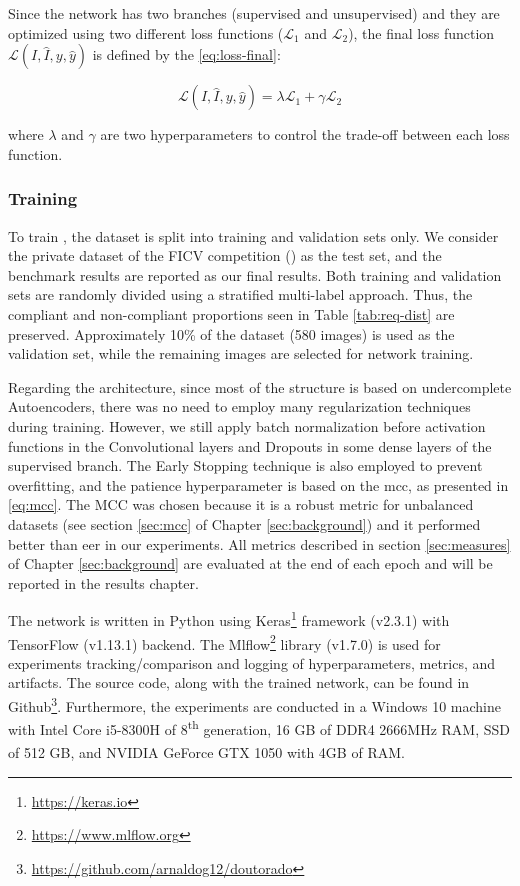 Since the network has two branches (supervised and unsupervised) and they are optimized using two different loss functions ($\mathcal{L}_1$ and $\mathcal{L}_2$), the final loss function $\mathcal{L}(I, \hat{I}, y, \hat{y})$ is defined by the \autoref{eq:loss-final}:

\begin{equation}
\label{eq:loss-final}
\mathcal{L}(I, \hat{I}, y, \hat{y}) = \lambda\mathcal{L}_1 + \gamma\mathcal{L}_2
\end{equation}

\noindent where $\lambda$ and $\gamma$ are two hyperparameters to control the trade-off between each loss function.

\subsubsection{Training} 

To train \methodname, the \ficvtest dataset is split into training and validation sets only. We consider the private dataset of the FICV competition (\ficvofficial) as the test set, and the benchmark results are reported as our final results. Both training and validation sets are randomly divided using a stratified multi-label approach. Thus, the compliant and non-compliant proportions seen in Table \ref{tab:req-dist} are preserved. Approximately 10\% of the dataset (580 images) is used as the validation set, while the remaining images are selected for network training.

Regarding the architecture, since most of the \methodname structure is based on undercomplete Autoencoders, there was no need to employ many regularization techniques during training. However, we still apply batch normalization before activation functions in the Convolutional layers and Dropouts in some dense layers of the supervised branch. The Early Stopping technique is also employed to prevent overfitting, and the patience hyperparameter is based on the \acl{mcc}, as presented in \autoref{eq:mcc}. The MCC was chosen because it is a robust metric for unbalanced datasets (see section \ref{sec:mcc} of Chapter \ref{sec:background}) and it performed better than \acs{eer} in our experiments. All metrics described in section \ref{sec:measures} of Chapter \ref{sec:background} are evaluated at the end of each epoch and will be reported in the results chapter.

The network is written in Python using Keras\footnote{\url{https://keras.io}} framework (v2.3.1) with TensorFlow (v1.13.1) backend. The Mlflow\footnote{\url{https://www.mlflow.org}} library (v1.7.0) is used for experiments tracking/comparison and logging of hyperparameters, metrics, and artifacts. The source code, along with the trained network, can be found in Github\footnote{\url{https://github.com/arnaldog12/doutorado}}. Furthermore, the experiments are conducted in a Windows 10 machine with Intel\textsuperscript{\tiny\textregistered} Core\textsuperscript{\tiny\texttrademark} i5-8300H of 8\textsuperscript{th} generation, 16 GB of DDR4 2666MHz RAM, SSD of 512 GB, and NVIDIA\textsuperscript{\tiny\textregistered} GeForce\textsuperscript{\tiny\textregistered} GTX 1050 with 4GB of RAM.

